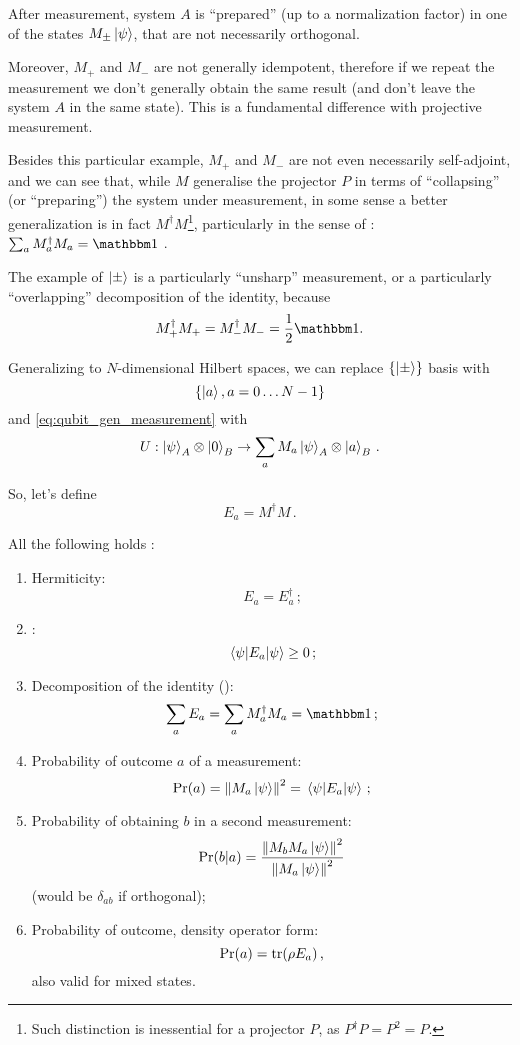After measurement, system $A$ is ``prepared''
(up to a normalization factor)
in one of the states $M_{\pm}\ket{\psi}$,
that are not necessarily orthogonal.

Moreover, $M_+$ and $M_-$ are not generally idempotent,
therefore if we repeat the measurement we don't generally
obtain the same result (and don't leave the system $A$ in the same state).
This is a fundamental difference with projective measurement.

Besides this particular example, $M_+$ and $M_-$ are not even necessarily
self-adjoint, and we can see that, while $M$ generalise the projector $P$
in terms of ``collapsing'' (or ``preparing'') the system under measurement,
in some sense a better generalization is in fact $M^{\dagger}M$\footnote{
  Such distinction is inessential for a projector $P$,
  as $P^{\dagger}P = P^2 = P$.
}, particularly in the sense of :
$\sum_a M_a^{\dagger}M_a = \idop$ \parencite[sec.3.1]{PreskillNotes}.

The example of $\ket{\pm}$ is a particularly ``unsharp'' measurement,
or a particularly ``overlapping'' decomposition of the identity,
because
$$M_+^{\dagger}M_+ = M_-^{\dagger}M_- = \frac{1}{2}\idop\text{.}$$

Generalizing to $N$-dimensional Hilbert spaces, we can replace
$\left\{\ket{\pm}\right\}$ basis with
\[
  \left\{\ket{a}, a = 0\ldots N-1\right\}
\]
and \eqref{eq:qubit_gen_measurement} with
\begin{equation}\label{eq:gen_measurement}
  U: \ket{\psi}_A \otimes \ket{0}_B \rightarrow \sum_a M_a\ket{\psi}_A \otimes \ket{a}_B
  \,\text{.}
\end{equation}

So, let's define
\[
  E_a = M^{\dagger}M \,\text{.}
\]

\citereset
All the following holds \parencite[sec.3.1]{PreskillNotes}:
\begin{enumerate}
  \item 
    Hermiticity: \[E_a = E_a^{\dagger}\,\text{;}\]
  \item
    : \[\expval{E_a}{\psi} \geq 0\,\text{;}\]  
  \item\label{listitem:POVM}
    Decomposition of the identity ():
    \begin{equation}\label{eq:POVM}
      \sum_a E_a = \sum_a M_a^{\dagger}M_a = \idop \,\text{;}
    \end{equation}
  \item
    Probability of outcome $a$ of a measurement:
    \[\Pr(a) = \norm{M_a\ket{\psi}}^2 = \expval{E_a}{\psi}\,\text{;}\]
  \item
    Probability of obtaining $b$ in a second measurement:
    \[\Pr(b|a) = \frac{\norm{M_bM_a\ket{\psi}}^2}{\norm{M_a\ket{\psi}}^2}\]
    (would be $\delta_{ab}$ if orthogonal);
  \item
    Probability of outcome, density operator form:
    \[\Pr(a) = \tr(\rho E_a)\,\text{,}\]
    also valid for mixed states.
\end{enumerate}

